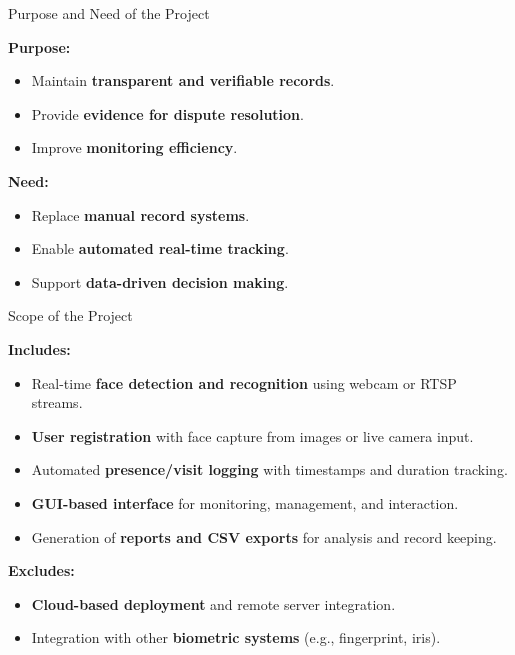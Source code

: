 \documentclass[10pt]{beamer}
\begin{document}
\begin{frame}{Purpose and Need of the Project}

\textbf{Purpose:}
\begin{itemize}
    \item Maintain \textbf{transparent and verifiable records}.
    \item Provide \textbf{evidence for dispute resolution}.
    \item Improve \textbf{monitoring efficiency}.
\end{itemize}

\vspace{0.3cm}

\textbf{Need:}
\begin{itemize}
    \item Replace \textbf{manual record systems}.
    \item Enable \textbf{automated real-time tracking}.
    \item Support \textbf{data-driven decision making}.
\end{itemize}

\end{frame}
\begin{frame}{Scope of the Project}

\textbf{Includes:}
\begin{itemize}
    \item Real-time \textbf{face detection and recognition} using webcam or RTSP streams.
    
    \item \textbf{User registration} with face capture from images or live camera input.
    
    \item Automated \textbf{presence/visit logging} with timestamps and duration tracking.
    
    \item \textbf{GUI-based interface} for monitoring, management, and interaction.
    
    \item Generation of \textbf{reports and CSV exports} for analysis and record keeping.
\end{itemize}

\vspace{0.3cm}

\textbf{Excludes:}
\begin{itemize}
    \item \textbf{Cloud-based deployment} and remote server integration.
    
    \item Integration with other \textbf{biometric systems} (e.g., fingerprint, iris).
    
\end{itemize}

\end{frame}
\end{document}
